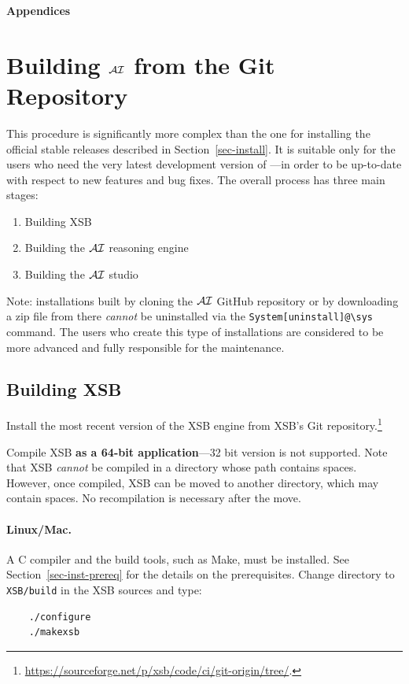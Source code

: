 \documentclass[11pt]{article}
\newcommand{\ERGO}{\mbox{\smaller{\ensuremath{\cal{E}}\smaller{{\sc{RGO}}}}}\xspace}
\newcommand{\ERGOAI}{\mbox{\smaller{\ensuremath{\cal{E}}\smaller{{\sc{RGO}}}}\ensuremath{\cal{AI}}}\xspace}
\newcommand{\FLSYSTEM}{\ERGO}
\begin{document}
\appendix

\newpage

\noindent
{\LARGE\bf Appendices}

\section{Building \ERGOAI from the Git Repository}
\label{app-building-ergo}

This procedure is significantly more complex than the one for installing
the official stable \FLSYSTEM releases described in Section~\ref{sec-install}. It is suitable only for the
users who need the very latest development version of \FLSYSTEM---in
order to be up-to-date with respect to new features and bug fixes.
The overall process has three main stages:
\begin{enumerate}
\item  Building XSB
\item  Building the \ERGOAI reasoning engine
\item Building the \ERGOAI studio
\end{enumerate}
Note: installations built by cloning the \ERGOAI GitHub repository or by
downloading a zip file from there \emph{cannot} be uninstalled via the
\verb|System[uninstall]@\sys| command. 
The users who create this type of installations are considered to be more
advanced and fully responsible for the maintenance.

\subsection{Building XSB}\label{sec-vc-compile}

Install the most recent version of the XSB engine from
XSB's Git repository.\footnote{
  \url{https://sourceforge.net/p/xsb/code/ci/git-origin/tree/}.
  }


Compile XSB \textbf{as a 64-bit application}---32 bit version is not
supported.
Note that XSB \emph{cannot} be compiled in a directory whose path contains
spaces.  However, once compiled, XSB can be moved to another directory,
which may contain spaces. No recompilation is necessary after the move.

\paragraph{Linux/Mac.}
A C compiler and the build tools, such as Make, must be installed.
See Section~\ref{sec-inst-prereq} for the details on the prerequisites.
Change directory to \texttt{XSB/build} in the XSB sources and type:
\begin{verbatim}
    ./configure
    ./makexsb
\end{verbatim}
\end{document}
